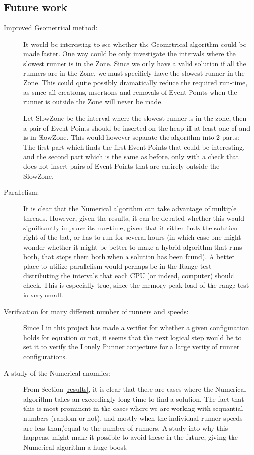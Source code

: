 \subsection{Future work}
\begin{description}
\item[Improved Geometrical method:] It would be interesting to see whether the Geometrical algorithm could be made faster. One way could be only investigate the intervals where the slowest runner is in the Zone. Since we only have a valid solution if all the runners are in the Zone, we must specificly have the slowest runner in the Zone. This could quite possibly dramatically reduce the required run-time, as since all creations, insertions and removals of Event Points when the runner is outside the Zone will never be made. 

Let SlowZone be the interval where the slowest runner is in the zone, then a pair of Event Points should be inserted on the heap iff at least one of \comStart and \comFin is in SlowZone. This would however separate the algorithm into 2 parts: The first part which finds the first Event Points that could be interesting, and the second part which is the same as before, only with a check that does not insert pairs of Event Points that are entirely outside the SlowZone.

\item[Parallelism:] It is clear that the Numerical algorithm can take advantage of multiple threads. However, given the results, it can be debated whether this would significantly improve its run-time, given that it either finds the solution right of the bat, or has to run for several hours (in which case one might wonder whether it might be better to make a hybrid algorithm that runs both, that stops them both when a solution has been found). A better place to utilize parallelism would perhaps be in the Range test, distributing the intervals that each CPU (or indeed, computer) should check. This is especially true, since the memory peak load of the range test is very small.

\item[Verification for many different number of runners and speeds:] Since I in this project has made a verifier for whether a given configuration holds for equation  or not, it seems that the next logical step would be to set it to verify the Lonely Runner conjecture for a large verity of runner configurations. 

\item[A study of the Numerical anomlies:] From Section \ref{results}, it is clear that there are cases where the Numerical algorithm takes an exceedingly long time to find a solution. The fact that this is most prominent in the cases where we are working with sequantial numbers (random or not), and mostly when the individual runner speeds are less than/equal to the number of runners. A study into why this happens, might make it possible to avoid these in the future, giving the Numerical algorithm a huge boost.


\end{description}
